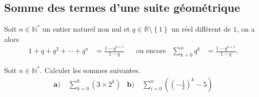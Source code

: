 \documentclass[11pt]{article}
\begin{document}
\subsection{Somme des termes d'une suite géométrique}
\begin{thm}
  Soit $n\in\mathbb{N}^*$ un entier naturel non nul et
  $q\in\mathbb{R}\setminus\left\{ 1 \right\}$ un réel différent de $1$, on a
  alors
  \begin{align*}
    1+q+q^2+\cdots+q^n &= \frac{1-q^{n+1}}{1-q} &
    &\text{ou encore} &
    \sum_{k=0}^n q^k &= \frac{1-q^{n+1}}{1-q}.
  \end{align*}
\end{thm}
\begin{app}
  Soit $n\in\mathbb{N}^*$. Calculer les sommes suivantes.
  \begin{align*}
    \textbf{a)}\;& \sum_{k=0}^{8} \left( 3\times2^k \right) &
    \textbf{b)}\;& \sum_{i=0}^{n} \left( \left( -\frac{1}{2} \right)^k-5\right)
  \end{align*}
\end{app}
\end{document}
